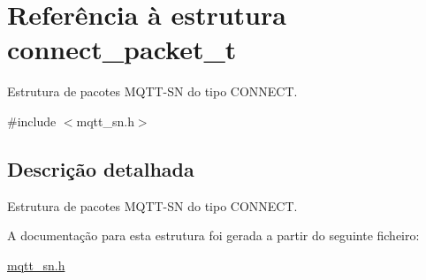 \hypertarget{structconnect__packet__t}{\section{Referência à estrutura connect\+\_\+packet\+\_\+t}
\label{structconnect__packet__t}
}


Estrutura de pacotes M\+Q\+T\+T-\/\+S\+N do tipo C\+O\+N\+N\+E\+C\+T.  




{\ttfamily \#include $<$mqtt\+\_\+sn.\+h$>$}



\subsection{Descrição detalhada}
Estrutura de pacotes M\+Q\+T\+T-\/\+S\+N do tipo C\+O\+N\+N\+E\+C\+T. 

A documentação para esta estrutura foi gerada a partir do seguinte ficheiro\+:\begin{DoxyCompactItemize}
\item 
\hyperlink{mqtt__sn_8h}{mqtt\+\_\+sn.\+h}\end{DoxyCompactItemize}
